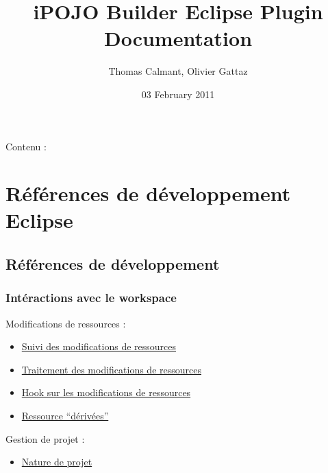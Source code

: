 \documentclass[letterpaper,10pt,french]{sphinxmanual}
\title{iPOJO Builder Eclipse Plugin Documentation}
\date{03 February 2011}
\author{Thomas Calmant, Olivier Gattaz}
\begin{document}
\maketitle
\tableofcontents
{}\label{index::doc}


Contenu :


\chapter{Références de développement Eclipse}
\label{eclipse/index:documentation-du-plugin-eclipse-ipojo-builder}\label{eclipse/index::doc}\label{eclipse/index:references-de-developpement-eclipse}

\section{Références de développement}
\label{eclipse/index:references-de-developpement}

\subsection{Intéractions avec le workspace}
\label{eclipse/index:interactions-avec-le-workspace}
Modifications de ressources :
\begin{itemize}
\item {} 
\href{http://help.eclipse.org/helios/index.jsp?topic=/org.eclipse.platform.doc.isv/guide/resAdv\_events.htm}{Suivi des modifications de ressources}

\item {} 
\href{http://help.eclipse.org/helios/index.jsp?topic=/org.eclipse.platform.doc.isv/guide/resAdv\_batching.htm}{Traitement des modifications de ressources}

\item {} 
\href{http://help.eclipse.org/helios/index.jsp?topic=/org.eclipse.platform.doc.isv/guide/resAdv\_hooks.htm}{Hook sur les modifications de ressources}

\item {} 
\href{http://help.eclipse.org/helios/index.jsp?topic=/org.eclipse.platform.doc.isv/guide/resAdv\_derived.htm}{Ressource ``dérivées''}

\end{itemize}

Gestion de projet :
\begin{itemize}
\item {} 
\href{http://help.eclipse.org/helios/index.jsp?topic=/org.eclipse.platform.doc.isv/guide/resAdv\_natures.htm}{Nature de projet}

\end{itemize}
\end{document}
